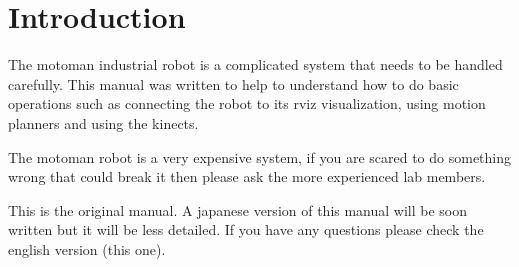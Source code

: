 \chapter{Introduction}
The motoman industrial robot is a complicated system that needs to be handled carefully. This manual was written to help to understand how to do basic operations such as connecting the robot to its rviz visualization, using motion planners and using the kinects.

The motoman robot is a very expensive system, if you are scared to do something wrong that could break it then please ask the more experienced lab members.

This is the original manual. A japanese version of this manual will be soon written but it will be less detailed. If you have any questions please check the english version (this one).
